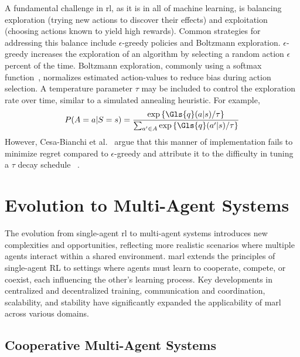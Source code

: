 A fundamental challenge in \gls{rl}, as it is in all of machine learning, 
is balancing exploration (trying new actions to discover their effects) 
and exploitation (choosing actions known to yield high rewards). 
Common strategies for addressing this balance include \(\epsilon\)-greedy 
policies and Boltzmann exploration.
\(\epsilon\)-greedy increases the exploration of an algorithm by selecting
a random action \(\epsilon\) percent of the time.
%
Boltzmann exploration, commonly using a softmax function~\cite{pan2021}, 
normalizes estimated action-values to reduce bias during action selection. 
A temperature parameter \(\tau\) may be included to control the exploration 
rate over time, similar to a simulated annealing heuristic. 
For example,
%
\begin{equation}
    P(A=a|S=s) =
    \frac{\exp\left\{\Gls{q}(a|s)/\tau\right\}}{
        \sum_{a^\prime\in A}\exp\left\{\Gls{q}(a^\prime|s)/\tau\right\}}
    \label{eq:softmax_action-value}
\end{equation}
However, Cesa-Bianchi et al.~\cite{cesa-bianchi2017} argue that this manner 
of implementation fails to minimize regret compared to \(\epsilon\)-greedy 
and attribute it to the difficulty in tuning a \(\tau\) decay schedule~
\cite{kaelbling1996,vermorel2005}.


\section{Evolution to Multi-Agent Systems}%


The evolution from single-agent \gls{rl} to multi-agent systems introduces new 
complexities and opportunities, reflecting more realistic scenarios where 
multiple agents interact within a shared environment. \Gls{marl} extends the 
principles of single-agent RL to settings where agents must learn to 
cooperate, compete, or coexist, each influencing the other's learning process.
Key developments in centralized and decentralized training, communication and 
coordination, scalability, and stability have significantly expanded the 
applicability of \gls{marl} across various domains. 

    \subsection*{Cooperative Multi-Agent Systems}%

